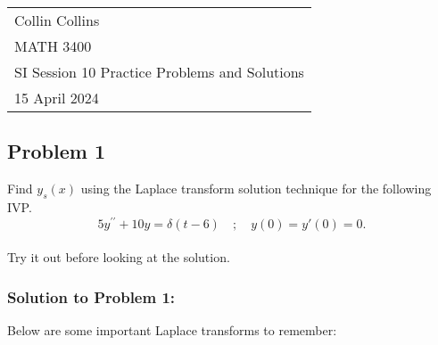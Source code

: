 \documentclass[a4paper,12pt]{article} %
\begin{document}



\thispagestyle{empty} %

\begin{tabular}{p{15.5cm}} %
\\ Collin Collins \\
MATH 3400\\
SI Session 10 Practice Problems and Solutions\\
15 April 2024 \\
\hline %

\end{tabular} 

\subsection*{Problem 1} Find $y_s(x)$ using the Laplace transform solution technique for the following IVP.
$$5y^{\prime \prime}+ 10y= \delta(t-6) \quad ; \quad y(0)=y'(0)=0 . $$
\\
 
Try it out before looking at the solution.
\pagebreak
 
\subsubsection*{Solution to Problem 1:}

Below are some important Laplace transforms to remember:
\end{document}
